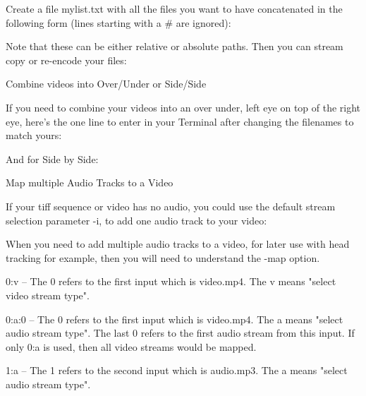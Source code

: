 \begin{fullwidth}
Create a file mylist.txt with all the files you want to have concatenated in the following form (lines starting with a # are ignored):


Note that these can be either relative or absolute paths. Then you can stream copy or re-encode your files:


{\large Combine videos into Over/Under or Side/Side \par}

If you need to combine your videos into an over under, left eye on top of the right eye, here’s the one line to enter in your Terminal after changing the filenames to match yours:


And for Side by Side:



{\large Map multiple Audio Tracks to a Video \par}

If your tiff sequence or video has no audio, you could use the default stream selection parameter -i, to add one audio track to your video: 


When you need to add multiple audio tracks to a video, for later use with head tracking for example, then you will need to understand the -map option.


0:v – The 0 refers to the first input which is video.mp4. The v means "select video stream type".

0:a:0 – The 0 refers to the first input which is video.mp4. The a means "select audio stream type". The last 0 refers to the first audio stream from this input. If only 0:a is used, then all video streams would be mapped.

1:a – The 1 refers to the second input which is audio.mp3. The a means "select audio stream type".


\end{fullwidth}
